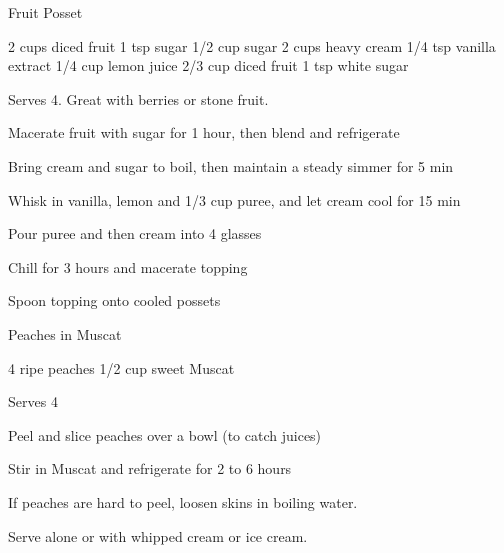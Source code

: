 
\begin{recipe}{Fruit Posset}{\vegetarian{}}
\begin{ingredients}
2 cups diced fruit
1 tsp sugar
1/2 cup sugar
2 cups heavy cream
1/4 tsp vanilla extract
1/4 cup lemon juice
2/3 cup diced fruit
1 tsp white sugar
\end{ingredients}
\nextcolumn
Serves 4. Great with berries or stone fruit.
\begin{steps}
    \item Macerate fruit with sugar for 1 hour, then blend and refrigerate
    \item Bring cream and sugar to boil, then maintain a steady simmer for 5 min
    \item Whisk in vanilla, lemon and 1/3 cup puree, and let cream cool for 15 min
    \item Pour puree and then cream into 4 glasses
    \item Chill for 3 hours and macerate topping
    \item Spoon topping onto cooled possets
\end{steps}
\end{recipe}

\begin{recipe}{Peaches in Muscat}{\vegetarian{}}
\begin{ingredients}
4 ripe peaches
1/2 cup sweet Muscat
\end{ingredients}
\nextcolumn
Serves 4
\begin{steps}
    \item Peel and slice peaches over a bowl (to catch juices)
    \item Stir in Muscat and refrigerate for 2 to 6 hours
\end{steps}
If peaches are hard to peel, loosen skins in boiling water.

Serve alone or with whipped cream or ice cream.
\end{recipe}

